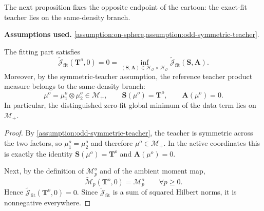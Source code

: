 The next proposition fixes the opposite endpoint of the cartoon: the exact-fit teacher lies on the same-density branch.
\begin{proposition}
\label{prop:reference-fit-minimum-on-Mplus}
\textbf{Assumptions used.} \cref{assumption:on-sphere,assumption:odd-symmetric-teacher}.

The fitting part satisfies
\begin{equation}
    \widetilde{\mathcal J}_{\mathrm{fit}}(\mathbf T^o,0)=0
    =
    \inf_{(\mathbf S,\mathbf A)\in \mathcal H_{\mathcal O}\times \mathcal H_{\mathcal O}}
    \widetilde{\mathcal J}_{\mathrm{fit}}(\mathbf S,\mathbf A).
\end{equation}
Moreover, by the symmetric-teacher assumption, the reference teacher
product measure belongs to the same-density branch:
\begin{equation}
    \mu^o=\mu_1^o\otimes\mu_2^o\in \mathcal M_+,
    \qquad
    \mathbf S(\mu^o)=\mathbf T^o,
    \qquad
    \mathbf A(\mu^o)=0.
\end{equation}
In particular, the distinguished zero-fit global minimum of the data term lies on $\mathcal M_+$.
\end{proposition}

\begin{proof}
By \cref{assumption:odd-symmetric-teacher}, the teacher is symmetric across the two factors, so $\mu_1^o=\mu_2^o$ and therefore $\mu^o\in \mathcal M_+$. In the active coordinates this is exactly the identity $\mathbf S(\mu^o)=\mathbf T^o$ and $\mathbf A(\mu^o)=0$.

Next, by the definition of $\mathcal M_p^o$ and of the ambient moment map,
\begin{equation}
    \widetilde{\mathcal M}_p(\mathbf T^o,0)=\mathcal M_p^o
    \qquad
    \forall p\ge 0.
\end{equation}
Hence $\widetilde{\mathcal J}_{\mathrm{fit}}(\mathbf T^o,0)=0$. Since $\widetilde{\mathcal J}_{\mathrm{fit}}$ is a sum of squared Hilbert norms, it is nonnegative everywhere.
\end{proof}
